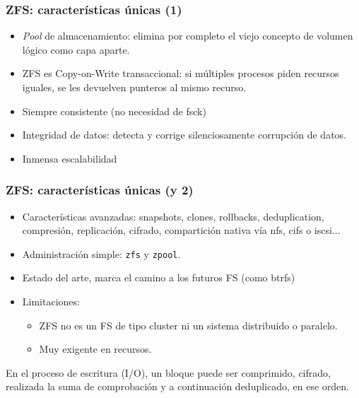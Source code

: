 \documentclass{beamer}
\begin{document}
\begin{frame}
  \frametitle{ZFS: características únicas (1)}
  \begin{itemize}
    \item \textit{Pool} de almacenamiento: elimina por completo el viejo concepto de volumen lógico como capa aparte.
    \item ZFS es Copy-on-Write transaccional: si múltiples procesos piden recursos iguales, se les devuelven punteros al mismo recurso. 
    \item Siempre consistente (no necesidad de fsck)
    \item Integridad de datos: detecta y corrige silenciosamente corrupción de datos.
    \item Inmensa escalabilidad
  \end{itemize}

\end{frame}


\begin{frame}
  \frametitle{ZFS: características únicas (y 2)}
  \begin{itemize}
    \item Características avanzadas: snapshots, clones, rollbacks, deduplication, compresión, replicación, cifrado, compartición nativa vía nfs, cifs o iscsi...
    \item  Administración simple: \texttt{zfs} y \texttt{zpool}.
    \item Estado del arte, marca el camino a los futuros FS (como btrfs)
    \item Limitaciones: 
  \begin{itemize}
    \item ZFS no es un FS de tipo cluster ni un sistema distribuido o paralelo.
    \item Muy exigente en recursos.
  \end{itemize}
  \end{itemize}

En el proceso de escritura (I/O), un bloque puede ser comprimido, cifrado, realizada la suma de comprobación y a continuación deduplicado, en ese orden.

\end{frame}
\end{document}
